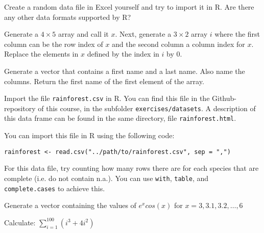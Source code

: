 \begin{exercise}
    Create a random data file in Excel yourself and try to import it in R. 
    Are there any other data formats supported by R?
\end{exercise}

\begin{exercise}
    Generate a $4 \times 5$ array and call it $x$. 
    Next, generate a $3 \times 2$ array $i$ where the first column can be the row index of $x$
    and the second column a column index for $x$. 
    Replace the elements in $x$ defined by the index in $i$ by 0. 
\end{exercise}

\begin{exercise}
    Generate a vector that contains a first name and a last name. Also name the columns. Return the first name of the first element of the array.
\end{exercise}

\begin{exercise}
    Import the file \texttt{rainforest.csv} in R.
    You can find this file in the Github-repository of this course, in the subfolder \texttt{exercises/datasets}. 
    A description of this data frame can be found in the same directory, file \texttt{rainforest.html}.

    You can import this file in R using the following code:
    \begin{lstlisting}
rainforest <- read.csv("../path/to/rainforest.csv", sep = ",")
    \end{lstlisting}

    For this data file, try counting how many rows there are for each species that are complete (i.e. do not contain n.a.). 
    You can use \texttt{with}, \texttt{table}, and \texttt{complete.cases} to achieve this.
\end{exercise}

\begin{exercise}
    Generate a vector containing the values of $e^x cos(x)$ for $x= 3, 3.1, 3.2, \dots ,6$
\end{exercise}

\begin{exercise}
    Calculate: $\sum_{i=1}^{100}(i^3 + 4i^2)$
\end{exercise}

